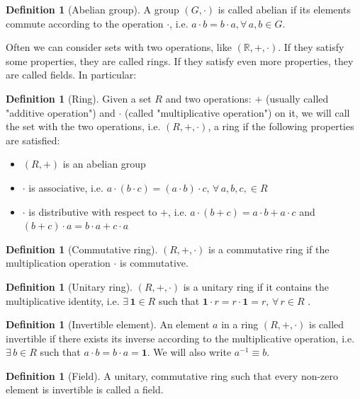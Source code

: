 \documentclass[a4paper,11pt,titlepage, article, oneside]{memoir}
\numberwithin{equation}{section}
\theoremstyle{definition}
\newtheorem{definition}[theorem]{Definition}
\theoremstyle{remark}
\begin{document}
\begin{definition} [Abelian group]
A group $(G, \cdot)$ is called abelian if its elements commute according to the operation $\cdot$, i.e. $a \cdot b = b \cdot a, \forall \,  a, b \in G$.
\end{definition}

Often we can consider sets with two operations, like $(\mathbb{R}, + , \cdot)$. If they satisfy some properties, they are called rings. If they satisfy even more properties, they are called fields. In particular:

\begin{definition} [Ring]
Given a set $R$ and two operations: $+$ (usually called "additive operation") and $\cdot$ (called "multiplicative operation") on it, we will call the set with the two operations, i.e. $(R, +, \cdot)$, a ring if the following properties are satisfied:
\begin{itemize}
\item $(R, +)$ is an abelian group
\item $\cdot$ is associative, i.e. $a \cdot (b \cdot c) = (a \cdot b) \cdot c, \, \forall\, a, b, c, \in R$
\item $\cdot$ is distributive with respect to $+$, i.e. $a \cdot (b + c) = a \cdot b + a \cdot c$ and $ (b + c) \cdot a = b \cdot a + c \cdot a$
\end{itemize}
\end{definition}

\begin{definition} [Commutative ring] $(R, +, \cdot)$ is a commutative ring if the multiplication operation $\cdot$ is commutative.
\end{definition}

\begin{definition} [Unitary ring]
$(R, +, \cdot)$ is a unitary ring if it contains the multiplicative identity, i.e. $\exists\, \mathbf{1} \in R$ such that $\mathbf{1} \cdot r = r \cdot \mathbf{1} =  r, \, \forall\, r \in R$ .
\end{definition}

\begin{definition}[Invertible element]
An element $a$ in a ring $(R, +, \cdot)$ is called invertible if there exists its inverse according to the multiplicative operation, i.e. $\exists\, b \in R$ such that $a \cdot b = b \cdot a = \mathbf{1}$. We will also write $a^{-1} \equiv b$.
\end{definition}

\begin{definition} [Field]
A unitary, commutative ring such that every non-zero element is invertible is called a field.
\end{definition}
\end{document}
